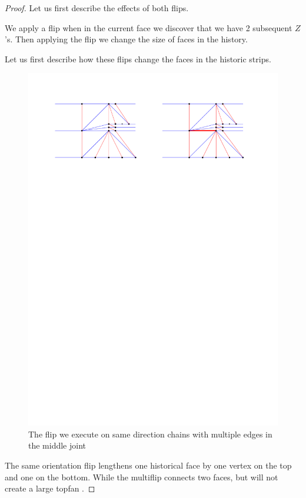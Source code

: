 \begin{proof}
  Let us first describe the effects of both flips.

  We apply a flip when in the current face we discover that we have 2 subsequent $Z$'s. Then applying the flip we change the size of faces in the history. 

  Let us first describe how these flips change the faces in the historic strips.
\begin{figure}[h]
  \centering
  \includegraphics[width =\textwidth]{unifiedAlgo/img/post/sameMultiFlip}
  \caption{The flip we execute on same direction chains with multiple edges in the middle joint}
  \label{fig:uni:sameMultiFlip}
\end{figure}
  The same orientation flip lengthens one historical face by one vertex on the top and one on the bottom. While the multiflip connects two faces, but will not create a large topfan .


\end{proof}
